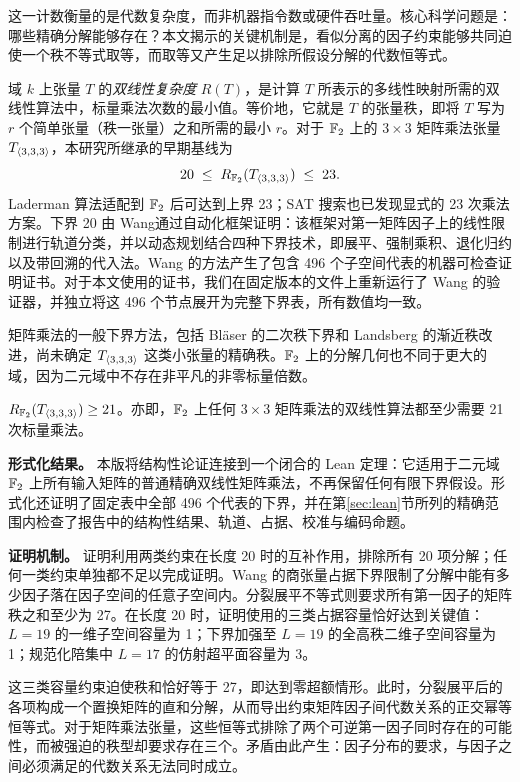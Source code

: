 \documentclass[11pt,a4paper]{article}
\begin{document}
这一计数衡量的是代数复杂度，而非机器指令数或硬件吞吐量。核心科学问题是：哪些精确分解能够存在？本文揭示的关键机制是，看似分离的因子约束能够共同迫使一个秩不等式取等，而取等又产生足以排除所假设分解的代数恒等式。

域 $k$ 上张量 $T$ 的\emph{双线性复杂度} $R(T)$，是计算 $T$ 所表示的多线性映射所需的双线性算法中，标量乘法次数的最小值。等价地，它就是 $T$ 的张量秩，即将 $T$ 写为 $r$ 个简单张量（秩一张量）之和所需的最小 $r$。对于 $\mathbb{F}_2$ 上的 $3\times3$ 矩阵乘法张量 $T_{\langle3,3,3\rangle}$，本研究所继承的早期基线为
\[
  20\;\le\;R_{\mathbb{F}_2}(T_{\langle3,3,3\rangle})\;\le\;23.
\]
Laderman 算法适配到 $\mathbb{F}_2$ 后可达到上界 23\cite{laderman1976noncommutative}；SAT 搜索也已发现显式的 23 次乘法方案\cite{heule2019waysa}。下界 20 由 Wang\cite{wangautomated}通过自动化框架证明：该框架对第一矩阵因子上的线性限制进行轨道分类，并以动态规划结合四种下界技术，即展平、强制乘积、退化归约以及带回溯的代入法。Wang 的方法产生了包含 496 个子空间代表的机器可检查证明证书。对于本文使用的证书，我们在固定版本的文件上重新运行了 Wang 的验证器，并独立将这 496 个节点展开为完整下界表，所有数值均一致。

矩阵乘法的一般下界方法，包括 Bläser 的二次秩下界和 Landsberg 的渐近秩改进\cite{blaser1999focs,landsberg2012lower}，尚未确定 $T_{\langle3,3,3\rangle}$ 这类小张量的精确秩。$\mathbb{F}_2$ 上的分解几何也不同于更大的域，因为二元域中不存在非平凡的非零标量倍数。

\begin{theorem}[主要结果]\label{thm:main}
  $R_{\mathbb{F}_2}(T_{\langle3,3,3\rangle})\ge21$。亦即，$\mathbb{F}_2$ 上任何 $3\times3$ 矩阵乘法的双线性算法都至少需要 21 次标量乘法。
\end{theorem}

\textbf{形式化结果。}\quad
本版将结构性论证连接到一个闭合的 Lean 定理：它适用于二元域 $\mathbb{F}_2$ 上所有输入矩阵的普通精确双线性矩阵乘法，不再保留任何有限下界假设。形式化还证明了固定表中全部 496 个代表的下界，并在第\ref{sec:lean}节所列的精确范围内检查了报告中的结构性结果、轨道、占据、校准与编码命题。

\textbf{证明机制。}\quad
证明利用两类约束在长度 20 时的互补作用，排除所有 20 项分解；任何一类约束单独都不足以完成证明。Wang 的商张量占据下界限制了分解中能有多少因子落在因子空间的任意子空间内。分裂展平不等式则要求所有第一因子的矩阵秩之和至少为 27。在长度 20 时，证明使用的三类占据容量恰好达到关键值：$L=19$ 的一维子空间容量为 1；下界加强至 $L=19$ 的全高秩二维子空间容量为 1；规范化陪集中 $L=17$ 的仿射超平面容量为 3。

这三类容量约束迫使秩和恰好等于 27，即达到零超额情形。此时，分裂展平后的各项构成一个置换矩阵的直和分解，从而导出约束矩阵因子间代数关系的正交幂等恒等式。对于矩阵乘法张量，这些恒等式排除了两个可逆第一因子同时存在的可能性，而被强迫的秩型却要求存在三个。矛盾由此产生：因子分布的要求，与因子之间必须满足的代数关系无法同时成立。
\end{document}
